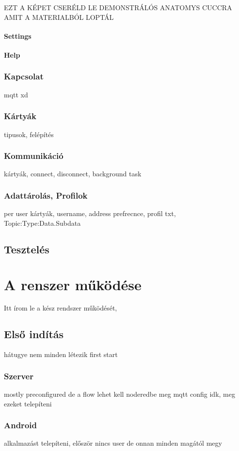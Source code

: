 \documentclass[
]{thesis-ekf}
\theoremstyle{definition}
\theoremstyle{remark}
\begin{document}
EZT A KÉPET CSERÉLD LE DEMONSTRÁLÓS ANATOMYS CUCCRA AMIT A MATERIALBÓL LOPTÁL
	
\subsubsection{Settings}
\subsubsection{Help}

\subsection{Kapcsolat}
mqtt xd
\subsection{Kártyák}
tipusok, felépítés
\subsection{Kommunikáció}
kártyák, connect, disconnect, background task
\subsection{Adattárolás, Profilok}
per user kártyák, username, address prefrecnce, profil txt, Topic:Type:Data.Subdata

\section{Tesztelés}



\chapter{A renszer működése}
Itt írom le a kész rendszer működését, 
\section{Első indítás}
hátugye nem minden létezik first start
\subsection{Szerver}
mostly preconfigured de a flow lehet kell noderedbe meg mqtt config idk, meg ezeket telepíteni
\subsection{Android}
alkalmazást telepíteni, először nincs user de onnan minden magától megy
\end{document}
